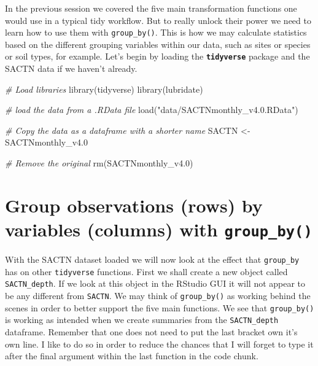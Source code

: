 \documentclass[
]{book}
\newenvironment{Shaded}{\begin{snugshade}}{\end{snugshade}}
\newcommand{\CommentTok}[1]{\textcolor[rgb]{0.56,0.35,0.01}{\textit{#1}}}
\newcommand{\FloatTok}[1]{\textcolor[rgb]{0.00,0.00,0.81}{#1}}
\newcommand{\FunctionTok}[1]{\textcolor[rgb]{0.00,0.00,0.00}{#1}}
\newcommand{\NormalTok}[1]{#1}
\newcommand{\OtherTok}[1]{\textcolor[rgb]{0.56,0.35,0.01}{#1}}
\newcommand{\StringTok}[1]{\textcolor[rgb]{0.31,0.60,0.02}{#1}}
\begin{document}
In the previous session we covered the five main transformation functions one would use in a typical tidy workflow. But to really unlock their power we need to learn how to use them with \texttt{group\_by()}. This is how we may calculate statistics based on the different grouping variables within our data, such as sites or species or soil types, for example. Let's begin by loading the \textbf{\texttt{tidyverse}} package and the SACTN data if we haven't already.

\begin{Shaded}
\begin{Highlighting}[]
\CommentTok{\# Load libraries}
\FunctionTok{library}\NormalTok{(tidyverse)}
\FunctionTok{library}\NormalTok{(lubridate)}

\CommentTok{\# load the data from a .RData file}
\FunctionTok{load}\NormalTok{(}\StringTok{"data/SACTNmonthly\_v4.0.RData"}\NormalTok{)}

\CommentTok{\# Copy the data as a dataframe with a shorter name}
\NormalTok{SACTN }\OtherTok{\textless{}{-}}\NormalTok{ SACTNmonthly\_v4}\FloatTok{.0}

\CommentTok{\# Remove the original}
\FunctionTok{rm}\NormalTok{(SACTNmonthly\_v4}\FloatTok{.0}\NormalTok{)}
\end{Highlighting}
\end{Shaded}

\hypertarget{group-observations-rows-by-variables-columns-with-group_by}{%
\section{\texorpdfstring{Group observations (rows) by variables (columns) with \texttt{group\_by()}}{Group observations (rows) by variables (columns) with group\_by()}}\label{group-observations-rows-by-variables-columns-with-group_by}}

With the SACTN dataset loaded we will now look at the effect that \texttt{group\_by} has on other \texttt{tidyverse} functions. First we shall create a new object called \texttt{SACTN\_depth}. If we look at this object in the RStudio GUI it will not appear to be any different from \texttt{SACTN}. We may think of \texttt{group\_by()} as working behind the scenes in order to better support the five main functions. We see that \texttt{group\_by()} is working as intended when we create summaries from the \texttt{SACTN\_depth} dataframe. Remember that one does not need to put the last bracket own it's own line. I like to do so in order to reduce the chances that I will forget to type it after the final argument within the last function in the code chunk.
\end{document}
